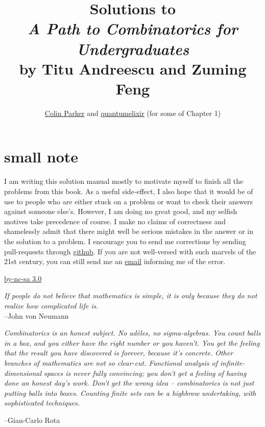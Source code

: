\documentclass{book}
\numberwithin{equation}{section}
\begin{document}
\title{Solutions to \\
\emph{A Path to Combinatorics for Undergraduates} \\
by Titu Andreescu and Zuming Feng}
\author{\href{https://github.com/cmp5au}{Colin Parker}
and \href{http://profiles.google.com/quantumelixir}{quantumelixir}
(for some of Chapter 1)}
\maketitle

\chapter*{small note}
I am writing this solution manual mostly to motivate myself to finish
all the problems from this book. As a useful side-effect, I also hope
that it would be of use to people who are either stuck on a problem or
want to check their answers against someone else's. However, I am doing
no great good, and my selfish motives take precedence of course. I make
no claims of correctness and shamelessly admit that there might well be
serious mistakes in the answer or in the solution to a problem. I
encourage you to send me corrections by sending pull-requests through
\href{http://github.com/cmp5au/path-to-combinatorics}{github}.
If you are not well-versed with such marvels of the 21st century, you
can still send me an \href{mailto:colin.parker@gmail.com}{email}
informing me of the error.

\vspace*{\fill}
\begin{center}
\href{http://creativecommons.org/licenses/by-nc-sa/3.0/}{by-nc-sa 3.0}
\end{center}

\newpage
\vspace*{\fill}
\begin{flushright}
\emph{If people do not believe that mathematics is simple, it is only
because they do not realize how complicated life is.}\\
--John von Neumann
\end{flushright}

\tableofcontents

\vspace*{\fill}
\emph{Combinatorics is an honest subject. No ad\`eles, no sigma-algebras.
You count balls in a box, and you either have the right number or you
haven't. You get the feeling that the result you have discovered is
forever, because it’s concrete. Other branches of mathematics are not so
clear-cut. Functional analysis of infinite-dimensional spaces is never
fully convincing; you don't get a feeling of having done an honest day's
work. Don't get the wrong idea – combinatorics is not just putting balls
into boxes. Counting finite sets can be a highbrow undertaking, with
sophisticated techniques.}\\
\begin{flushright}
--Gian-Carlo Rota
\end{flushright}
\vspace*{\fill}
\end{document}
